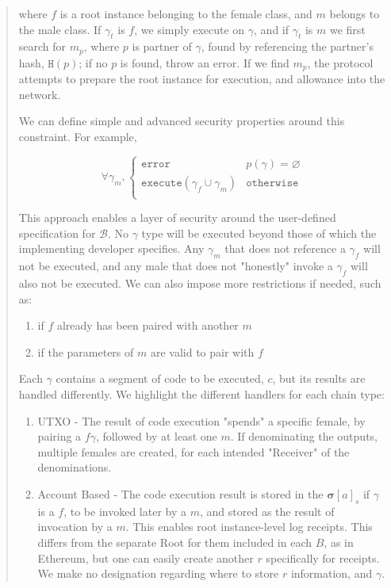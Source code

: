 \documentclass[12pt, titlepage, twocolumn]{report}
\begin{document}
\begin{quotation}
where \(f\) is a root instance belonging to the female class, and \(m\) belongs to the male class. If \(\gamma_{t}\) is \(f\), we simply execute on \(\gamma\), and if \(\gamma_{t}\) is \(m\) we first search for \(m_{p}\), where \(p\) is partner of \(\gamma\), found by referencing the partner's hash, \(\texttt{H}(p)\); if no \(p\) is found, throw an error. If we find \(m_{p}\), the protocol attempts to prepare the root instance for execution, and allowance into the network.

We can define simple and advanced security properties around this constraint. For example,

\begin{equation}
\forall \gamma_m, \begin{cases} 
      \texttt{error} & p(\gamma) = \varnothing \\
      \texttt{execute}(\gamma_f \cup \gamma_m)   & \texttt{otherwise}  \\
   \end{cases}
\end{equation}

This approach enables a layer of security around the user-defined specification for \( \boldsymbol{\mathcal{B}} \). No \(\gamma\) type will be executed beyond those of which the implementing developer specifies. Any \(\gamma_m\) that does not reference a \(\gamma_f\) will not be executed, and any male that does not "honestly" invoke a \(\gamma_f\) will also not be executed. We can also impose more restrictions if needed, such as:

\begin{enumerate}
	\item if \(f\) already has been paired with another \(m\)
	\item if the parameters of \(m\) are valid to pair with \(f\)
\end{enumerate}

Each \(\gamma\) contains a segment of code to be executed, \(c\), but its results are handled differently. We highlight the different handlers for each chain type:

\begin{enumerate}
	\item UTXO - The result of code execution "spends" a specific female, by pairing a \(f \gamma\), followed by at least one \(m\). If denominating the outputs, multiple females are created, for each intended "Receiver" of the denominations.
	\item Account Based - The code execution result is stored in the \( \boldsymbol{ \sigma } [a]_{s} \) if \(\gamma\) is a \(f\), to be invoked later by a \(m\), and stored as the result of invocation by a \(m\). This enables root instance-level log receipts. This differs from the separate Root for them included in each \(B\), as in Ethereum, but one can easily create another \(r\) specifically for receipts. We make no designation regarding where to store \(r\) information, and \(\gamma\).
\end{enumerate}



\end{quotation}
\end{document}
